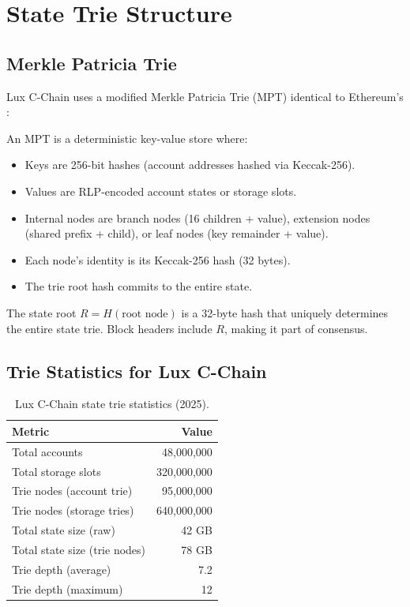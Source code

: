 \section{State Trie Structure}
\label{sec:trie}

\subsection{Merkle Patricia Trie}

Lux C-Chain uses a modified Merkle Patricia Trie (MPT) identical to Ethereum's \cite{wood2014ethereum}:

\begin{definition}
An MPT is a deterministic key-value store where:
\begin{itemize}
    \item Keys are 256-bit hashes (account addresses hashed via Keccak-256).
    \item Values are RLP-encoded account states or storage slots.
    \item Internal nodes are branch nodes (16 children + value), extension nodes (shared prefix + child), or leaf nodes (key remainder + value).
    \item Each node's identity is its Keccak-256 hash (32 bytes).
    \item The trie root hash commits to the entire state.
\end{itemize}
\end{definition}

\begin{definition}
The state root $R = H(\text{root node})$ is a 32-byte hash that uniquely determines the entire state trie. Block headers include $R$, making it part of consensus.
\end{definition}

\subsection{Trie Statistics for Lux C-Chain}

\begin{table}[H]
\centering
\caption{Lux C-Chain state trie statistics (2025).}
\label{tab:stats}
\begin{tabular}{lr}
\toprule
\textbf{Metric} & \textbf{Value} \\
\midrule
Total accounts & 48,000,000 \\
Total storage slots & 320,000,000 \\
Trie nodes (account trie) & 95,000,000 \\
Trie nodes (storage tries) & 640,000,000 \\
Total state size (raw) & 42 GB \\
Total state size (trie nodes) & 78 GB \\
Trie depth (average) & 7.2 \\
Trie depth (maximum) & 12 \\
\bottomrule
\end{tabular}
\end{table}

